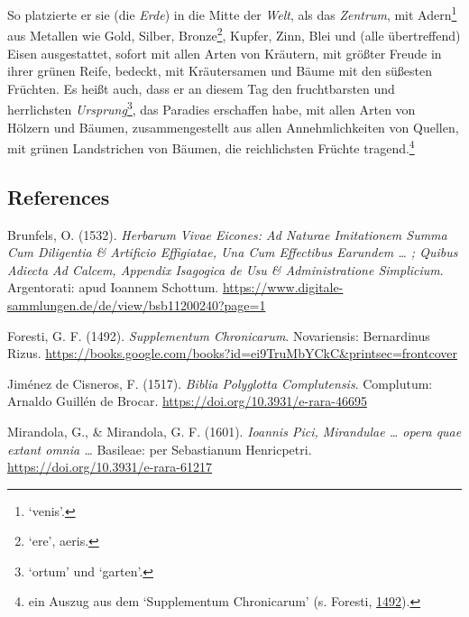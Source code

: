 \documentclass[
]{article}
\begin{document}
So platzierte er sie (die \emph{Erde}) in die Mitte der \emph{Welt}, als
das \emph{Zentrum}, mit Adern\footnote{`venis'.} aus Metallen wie Gold,
Silber, Bronze\footnote{`ere', aeris.}, Kupfer, Zinn, Blei und (alle
übertreffend) Eisen ausgestattet, sofort mit allen Arten von Kräutern,
mit größter Freude in ihrer grünen Reife, bedeckt, mit Kräutersamen und
Bäume mit den süßesten Früchten. Es heißt auch, dass er an diesem Tag
den fruchtbarsten und herrlichsten \emph{Ursprung}\footnote{`ortum' und
  `garten'.}, das Paradies erschaffen habe, mit allen Arten von Hölzern
und Bäumen, zusammengestellt aus allen Annehmlichkeiten von Quellen, mit
grünen Landstrichen von Bäumen, die reichlichsten Früchte
tragend.\footnote{ein Auszug aus dem `Supplementum Chronicarum' (s.
  Foresti,
  \href{https://books.google.com/books?id=ei9TruMbYCkC\&printsec=frontcover}{1492}).}

\hypertarget{references}{%
\subsection{References}\label{references}}

Brunfels, O. (1532). \emph{Herbarum Vivae Eicones: Ad Naturae
Imitationem Summa Cum Diligentia \& Artificio Effigiatae, Una Cum
Effectibus Earundem \ldots{} ; Quibus Adiecta Ad Calcem, Appendix
Isagogica de Usu \& Administratione Simplicium}. Argentorati: apud
Ioannem Schottum.
\url{https://www.digitale-sammlungen.de/de/view/bsb11200240?page=1}

Foresti, G. F. (1492). \emph{Supplementum Chronicarum}. Novariensis:
Bernardinus Rizus.
\url{https://books.google.com/books?id=ei9TruMbYCkC\&printsec=frontcover}

Jiménez de Cisneros, F. (1517). \emph{Biblia Polyglotta Complutensis}.
Complutum: Arnaldo Guillén de Brocar.
\url{https://doi.org/10.3931/e-rara-46695}

Mirandola, G., \& Mirandola, G. F. (1601). \emph{Ioannis Pici,
Mirandulae \ldots{} opera quae extant omnia \ldots{}} Basileae: per
Sebastianum Henricpetri. \url{https://doi.org/10.3931/e-rara-61217}
\end{document}
